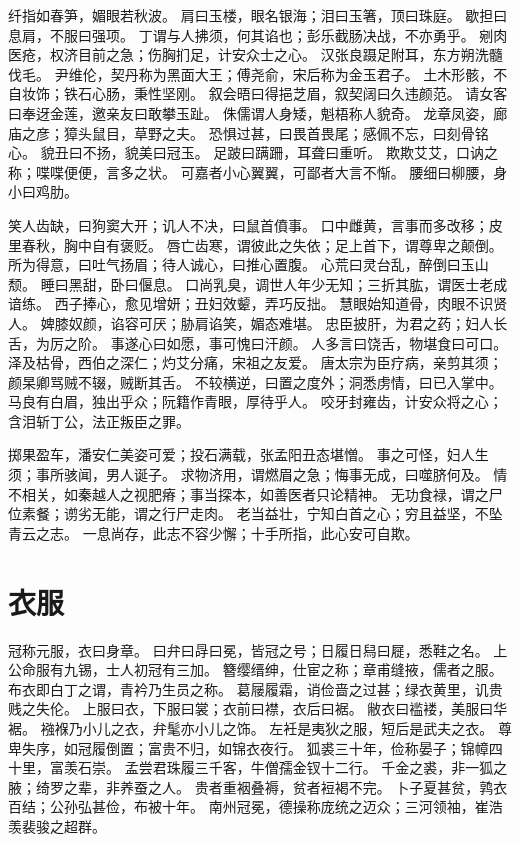 \documentclass[12pt,UTF8]{ctexbook}
\begin{document}
纤指如春笋，媚眼若秋波。
肩曰玉楼，眼名银海；泪曰玉箸，顶曰珠庭。
歇担曰息肩，不服曰强项。
丁谓与人拂须，何其谄也；彭乐截肠决战，不亦勇乎。
剜肉医疮，权济目前之急；伤胸扪足，计安众士之心。
汉张良蹑足附耳，东方朔洗髓伐毛。
尹维伦，契丹称为黑面大王；傅尧俞，宋后称为金玉君子。
土木形骸，不自妆饰；铁石心肠，秉性坚刚。
叙会晤曰得挹芝眉，叙契阔曰久违颜范。
请女客曰奉迓金莲，邀亲友曰敢攀玉趾。
侏儒谓人身矮，魁梧称人貌奇。
龙章凤姿，廊庙之彦；獐头鼠目，草野之夫。
恐惧过甚，曰畏首畏尾；感佩不忘，曰刻骨铭心。
貌丑曰不扬，貌美曰冠玉。
足跛曰蹒跚，耳聋曰重听。
欺欺艾艾，口讷之称；喋喋便便，言多之状。
可嘉者小心翼翼，可鄙者大言不惭。
腰细曰柳腰，身小曰鸡肋。

笑人齿缺，曰狗窦大开；讥人不决，曰鼠首僨事。
口中雌黄，言事而多改移；皮里春秋，胸中自有褒贬。
唇亡齿寒，谓彼此之失依；足上首下，谓尊卑之颠倒。
所为得意，曰吐气扬眉；待人诚心，曰推心置腹。
心荒曰灵台乱，醉倒曰玉山颓。
睡曰黑甜，卧曰偃息。
口尚乳臭，调世人年少无知；三折其肱，谓医士老成谙练。
西子捧心，愈见增妍；丑妇效颦，弄巧反拙。
慧眼始知道骨，肉眼不识贤人。
婢膝奴颜，谄容可厌；胁肩谄笑，媚态难堪。
忠臣披肝，为君之药；妇人长舌，为厉之阶。
事遂心曰如愿，事可愧曰汗颜。
人多言曰饶舌，物堪食曰可口。
泽及枯骨，西伯之深仁；灼艾分痛，宋祖之友爱。
唐太宗为臣疗病，亲剪其须；颜杲卿骂贼不辍，贼断其舌。
不较横逆，曰置之度外；洞悉虏情，曰已入掌中。
马良有白眉，独出乎众；阮籍作青眼，厚待乎人。
咬牙封雍齿，计安众将之心；含泪斩丁公，法正叛臣之罪。

掷果盈车，潘安仁美姿可爱；投石满载，张孟阳丑态堪憎。
事之可怪，妇人生须；事所骇闻，男人诞子。
求物济用，谓燃眉之急；悔事无成，曰噬脐何及。
情不相关，如秦越人之视肥瘠；事当探本，如善医者只论精神。
无功食禄，谓之尸位素餐；谫劣无能，谓之行尸走肉。
老当益壮，宁知白首之心；穷且益坚，不坠青云之志。
一息尚存，此志不容少懈；十手所指，此心安可自欺。

\chapter{衣服}

冠称元服，衣曰身章。
曰弁曰冔曰冕，皆冠之号；日履日舄曰屣，悉鞋之名。
上公命服有九锡，士人初冠有三加。
簪缨缙绅，仕宦之称；章甫缝掖，儒者之服。
布衣即白丁之谓，青衿乃生员之称。
葛屦履霜，诮俭啬之过甚；绿衣黄里，讥贵贱之失伦。
上服曰衣，下服曰裳；衣前曰襟，衣后曰裾。
敝衣曰褴褛，美服曰华裾。
襁褓乃小儿之衣，弁髦亦小儿之饰。
左衽是夷狄之服，短后是武夫之衣。
尊卑失序，如冠履倒置；富贵不归，如锦衣夜行。
狐裘三十年，俭称晏子；锦幛四十里，富羡石崇。
孟尝君珠履三千客，牛僧孺金钗十二行。
千金之裘，非一狐之腋；绮罗之辈，非养蚕之人。
贵者重裀叠褥，贫者裋褐不完。
卜子夏甚贫，鹑衣百结；公孙弘甚俭，布被十年。
南州冠冕，德操称庞统之迈众；三河领袖，崔浩羡裴骏之超群。
\end{document}
